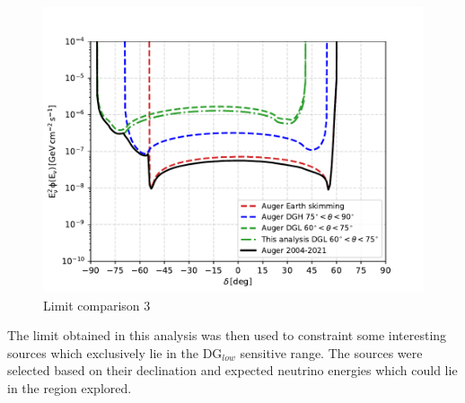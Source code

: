 \begin{figure}[t!]
  \centering
  \includegraphics[width=14.5cm]{thesis_figures/PointLimits/Point_comp_combined_3.pdf}
  \caption{Limit comparison 3}
  \label{fig:Dec_limit_comb3}
\end{figure}

The limit obtained in this analysis was then used to constraint some interesting sources which exclusively lie in the DG$_{low}$ sensitive range. The sources were selected based on their declination and expected neutrino energies which could lie in the region explored.  




